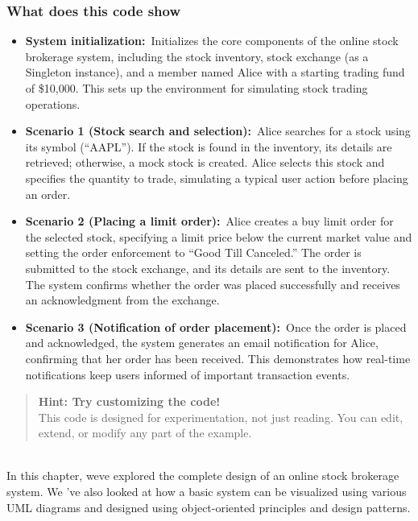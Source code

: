 \subsubsection{What does this code show}\label{J3bG_llM0NV0b5TuMrvue}

\begin{itemize}
\item
\protect{}\label{QNhNF0lWcoHL4LCsans-7}
\textbf{System initialization:}~Initializes the core components of the online stock brokerage system, including the stock inventory, stock exchange (as a Singleton instance), and a member named Alice with a starting trading fund of \$10,000. This sets up the environment for simulating stock trading operations.
\item
\protect{}\label{Ja9Pb1jptavE7CAZAYazm}
\textbf{Scenario 1 (Stock search and selection):}~Alice searches for a stock using its symbol (``AAPL''). If the stock is found in the inventory, its details are retrieved; otherwise, a mock stock is created. Alice selects this stock and specifies the quantity to trade, simulating a typical user action before placing an order.
\item
\protect{}\label{37Nusdx2j7vxmAjmHorJJ}
\textbf{Scenario 2 (Placing a limit order):}~Alice creates a buy limit order for the selected stock, specifying a limit price below the current market value and setting the order enforcement to ``Good Till Canceled.'' The order is submitted to the stock exchange, and its details are sent to the inventory. The system confirms whether the order was placed successfully and receives an acknowledgment from the exchange.
\item
\protect{}\label{Ta_ogv30GFWYKXifp8kp2}
\textbf{Scenario 3 (Notification of order placement):}~Once the order is placed and acknowledged, the system generates an email notification for Alice, confirming that her order has been received. This demonstrates how real-time notifications keep users informed of important transaction events.
\end{itemize}
\begin{quote}
\textbf{Hint: Try customizing the code!}\\
This code is designed for experimentation, not just reading. You can edit, extend, or modify any part of the example.
\end{quote}
\\
In this chapter, we\textquotesingle ve explored the complete design of an online stock brokerage system. We 've also looked at how a basic system can be visualized using various UML diagrams and designed using object-oriented principles and design patterns.

